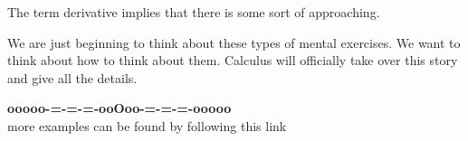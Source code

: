 \documentclass{ximera}
\begin{document}
The term derivative implies that there is some sort of approaching.


We are just beginning to think about these types of mental exercises. We want to think about how to think about them.  Calculus will officially take over this story and give all the details.























\begin{onlineOnly}
\begin{center}
\textbf{\textcolor{green!50!black}{ooooo-=-=-=-ooOoo-=-=-=-ooooo}} \\

more examples can be found by following this link\\ 

\end{center}
\end{onlineOnly}
\end{document}
